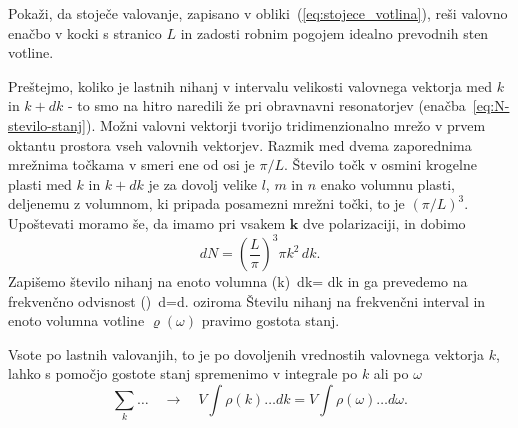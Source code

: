\begin{definition}
 Pokaži, da stoječe valovanje, zapisano v obliki~(\ref{eq:stojece_votlina}), reši 
 valovno enačbo v kocki s stranico $L$ in zadosti robnim pogojem idealno prevodnih sten votline.
\end{definition}

Preštejmo, koliko je lastnih nihanj v intervalu velikosti valovnega
vektorja med $k$ in $k+dk$ - to smo na hitro naredili že pri obravnavni
resonatorjev (enačba~\ref{eq:N-stevilo-stanj}). Možni valovni vektorji tvorijo tridimenzionalno
mrežo v prvem oktantu prostora vseh valovnih vektorjev. Razmik med
dvema zaporednima mrežnima točkama v smeri ene od osi je $\pi/L$.
Število točk v osmini krogelne plasti med $k$ in $k+dk$ je za dovolj
velike $l$, $m$ in $n$ enako volumnu plasti, deljenemu
z volumnom, ki pripada posamezni mrežni točki, to je $(\pi/L)^{3}$.
Upoštevati moramo še, da imamo pri vsakem $\mathbf{k}$ dve polarizaciji, in dobimo
\begin{equation}
dN=\left(\frac{L}{\pi}\right)^{3}\pi k^{2}\, dk.
\label{4.2}
\end{equation}
Zapišemo število nihanj na enoto volumna
\beq
\rho(k)\, dk= dk
\label{4.3}
\eeq
in ga prevedemo na frekvenčno odvisnost
\beq
\rho(\nu)\, d\nu=d\nu.
\eeq
oziroma
Številu nihanj na frekvenčni interval in enoto volumna votline $\varrho (\omega)$ 
pravimo gostota stanj.

Vsote po lastnih valovanjih, to je po dovoljenih vrednostih valovnega vektorja $k$,
lahko s pomočjo gostote stanj spremenimo v integrale po $k$ ali po $\omega$
\begin{equation}
\sum_{k}\ldots \quad \rightarrow \quad V\int\rho(k)\ldots dk=V\int\rho(\omega)\ldots d\omega.
\label{4.5}
\end{equation}

